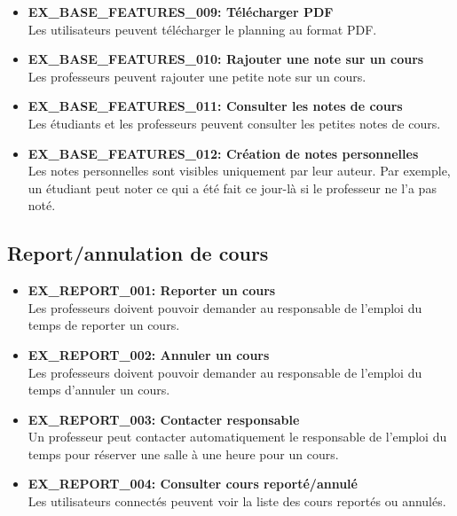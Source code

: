\documentclass[a4paper,12pt]{article}
\begin{document}
\begin{itemize}
    \item \textbf{EX\_BASE\_FEATURES\_009: Télécharger PDF} \\
    Les utilisateurs peuvent télécharger le planning au format PDF.

    \item \textbf{EX\_BASE\_FEATURES\_010: Rajouter une note sur un cours} \\
    Les professeurs peuvent rajouter une petite note sur un cours.

    \item \textbf{EX\_BASE\_FEATURES\_011: Consulter les notes de cours} \\
    Les étudiants et les professeurs peuvent consulter les petites notes de cours.

    \item \textbf{EX\_BASE\_FEATURES\_012: Création de notes personnelles} \\
    Les notes personnelles sont visibles uniquement par leur auteur. Par exemple, un étudiant peut noter ce qui a été fait ce jour-là si le professeur ne l'a pas noté.
\end{itemize}

\subsection{Report/annulation de cours}

\begin{itemize}
    \item \textbf{EX\_REPORT\_001: Reporter un cours} \\
    Les professeurs doivent pouvoir demander au responsable de l'emploi du temps de reporter un cours.

    \item \textbf{EX\_REPORT\_002: Annuler un cours} \\
    Les professeurs doivent pouvoir demander au responsable de l'emploi du temps d'annuler un cours.

    \item \textbf{EX\_REPORT\_003: Contacter responsable} \\
    Un professeur peut contacter automatiquement le responsable de l'emploi du temps pour réserver une salle à une heure pour un cours.

    \item \textbf{EX\_REPORT\_004: Consulter cours reporté/annulé} \\
    Les utilisateurs connectés peuvent voir la liste des cours reportés ou annulés.
\end{itemize}
\end{document}
